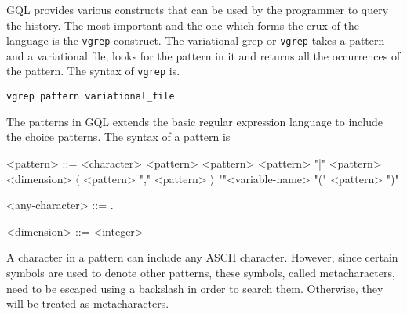 GQL provides various constructs that can be used by the programmer to query the history. The most important and the one which forms the crux of the language is the \texttt{vgrep} construct. The variational grep or \texttt{vgrep} takes a pattern and a variational file, looks for the pattern in it and returns all the occurrences of the pattern. The syntax of \texttt{vgrep} is.

\begin{lstlisting}
vgrep pattern variational_file
\end{lstlisting}

The patterns in GQL extends the basic regular expression language to include the choice patterns. The syntax of a pattern is


\setlength{\grammarindent}{5em} %
\begin{grammar} 

<pattern> ::= <character>  
            \alt <pattern> <pattern>
            \alt <pattern> "|" <pattern>
            \alt <dimension> $\langle$ <pattern> "," <pattern> $\rangle$
            \alt "\textdollar"<variable-name>
            \alt "(" <pattern> ")"

<any-character> ::= .

<dimension>    ::= <integer>  %

\end{grammar}


A character in a pattern can include any ASCII character. However, since certain symbols are used to denote other patterns, these symbols, called metacharacters, need to be escaped using a backslash in order to search them. Otherwise, they will be treated as metacharacters. %

